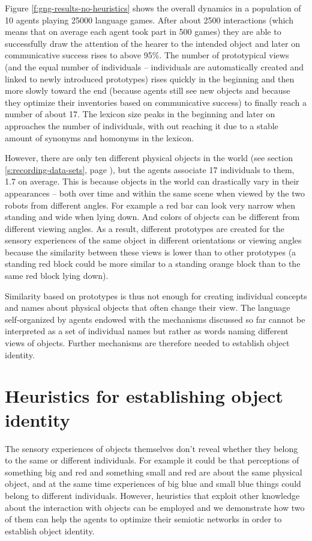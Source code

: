 Figure \ref{f:gng-results-no-heuristics} shows
the overall dynamics in a population of 10 agents playing 25000
language games. After about 2500 interactions (which means that on
average each agent took part in 500 games) they are able to
successfully draw the attention of the hearer to the intended object
and later on communicative success rises to above 95$\%$. The number
of prototypical views (and the equal number of individuals --
individuals are automatically created and linked to newly introduced
prototypes) rises quickly in the beginning and then more slowly toward
the end (because agents still see new objects and because they
optimize their inventories based on communicative success) to finally
reach a number of about 17. The lexicon size peaks in the beginning
and later on approaches the number of individuals, with out reaching
it due to a stable amount of synonyms and homonyms in the lexicon.

However, there are only ten different physical objects in the world
(see section \ref{s:recording-data-sets}, page
\pageref{s:recording-data-sets}), but the agents associate 17
individuals to them, 1.7 on average. This is because objects in the
world can drastically vary in their appearances -- both over time and
within the same scene when viewed by the two robots from different
angles. For example a red bar can look very narrow when standing and
wide when lying down. And colors of objects can be different from
different viewing angles. As a result, different prototypes are
created for the sensory experiences of the same object in different
orientations or viewing angles because the similarity between these
views is lower than to other prototypes (a standing red block could be
more similar to a standing orange block than to the same red block
lying down).

Similarity based on prototypes is thus not enough for creating
individual concepts and names about physical objects that often change
their view. The language self-organized by agents endowed with the
mechanisms discussed so far cannot be interpreted as a set of
individual names but rather as words naming different views of
objects. Further mechanisms are therefore needed to establish object
identity.

\section{Heuristics for establishing object identity}
\label{s:gng-heuristics}

The sensory experiences of objects themselves don't reveal whether
they belong to the same or different individuals. For example it could
be that perceptions of something big and red and something small and
red are about the same physical object, and at the same time
experiences of big blue and small blue things could belong to
different individuals. However, heuristics that exploit other
knowledge about the interaction with objects can be employed and we
demonstrate how two of them can help the agents to optimize their
semiotic networks in order to establish object identity.

